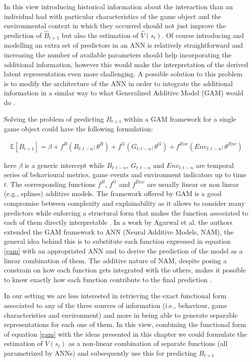 In this view introducing historical information about the interaction than an individual had with particular characteristics of the game object and the environmental context in which they occurred should not just improve the prediction of $\widehat{B}_{t+1}$ but also the estimation of $\widehat{V}(s_t)$. Of course introducing and modelling an extra set of predictors in an ANN is relatively straightforward and increasing the number of available parameters should help incorporating the additional information, however this would make the interpretation of the derived latent representation even more challenging. A possible solution to this problem is to modify the architecture of the ANN in order to integrate the additional information in a similar way to what Generalized Additive Model (GAM) would do \cite{hastie2017generalized}. 

Solving the problem of predicting $B_{t+1}$ within a GAM framework for a single game object could have the following formulation:

\begin{gather}
\label{gam}
    \mathbb{E}[{B}_{t+1}] = \beta + f^{B}(B_{t:t-n};\theta^{B}) + f^{G}(G_{t:t-n};\theta^{G}) + f^{Env}(Env_{t:t-n};\theta^{Env})
\end{gather}

here $\beta$ is a generic intercept while $B_{t:t-n}$, $G_{t:t-n}$ and $Env_{t:t-n}$ are temporal series of behavioural metrics, game events and environment indicators up to time $t$. The corresponding functions $f^{B}$, $f^{G}$ and $f^{Env}$ are usually linear or non linear (e.g., splines) additive models. The framework offered by GAM is a good compromise between complexity and explainability as it allows to consider many predictors while enforcing a structural form that makes the function associated to each of them directly interpretable \cite{hastie2017generalized}. In a work by Agarwal et al. \cite{agarwal2021neural} the authors extended the GAM framework to ANN (Neural Additive Models, NAM), the general idea behind this is to substitute each function expressed in equation \ref{gam} with an appropriated ANN and to derive the prediction of the model as a linear combination of them. The additive nature of NAM, despite posing a constrain on how each function gets integrated with the others, makes it possible to know exactly how each function contribute to the final prediction \cite{hastie2017generalized,agarwal2017quitting}. 

In our setting we are less interested in retrieving the exact functional form associated to any of the three sources of information (i.e., behaviour, game characteristics and environment) and more in being able to generate separable representations for each one of them. In this view, combining the functional form of equation \ref{gam} with the ideas presented in this chapter we could formulate the estimation of $V(s_t)$ as a non-linear combination of separate functions (all parametrized by ANNs) and subsequently use this for predicting $B_{t+1}$

